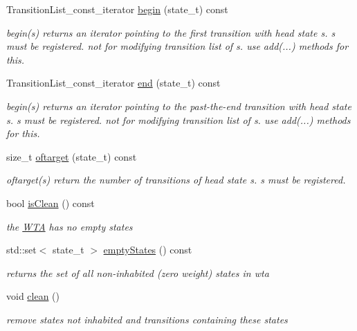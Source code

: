 \begin{DoxyCompactItemize}
Transition\+List\+\_\+const\+\_\+iterator \mbox{\hyperlink{group__schemata_ga23c3f9884c683e4bbab323208e08c672}{begin}} (state\+\_\+t) const
\begin{DoxyCompactList}\small\item\em begin(s) returns an iterator pointing to the first transition with head state s. s must be registered. not for modifying transition list of s. use add(...) methods for this. \end{DoxyCompactList}\item 
Transition\+List\+\_\+const\+\_\+iterator \mbox{\hyperlink{group__schemata_gaf5075f5a210343d6da208f4c80421cb5}{end}} (state\+\_\+t) const
\begin{DoxyCompactList}\small\item\em begin(s) returns an iterator pointing to the past-\/the-\/end transition with head state s. s must be registered. not for modifying transition list of s. use add(...) methods for this. \end{DoxyCompactList}\item 
size\+\_\+t \mbox{\hyperlink{group__schemata_ga28c9a7e35d4d516ef0f9967e773305f8}{oftarget}} (state\+\_\+t) const
\begin{DoxyCompactList}\small\item\em oftarget(s) return the number of transitions of head state s. s must be registered. \end{DoxyCompactList}\item 
bool \mbox{\hyperlink{group__schemata_ga9ef4193ae949ae7c9e52d30720e37202}{is\+Clean}} () const
\begin{DoxyCompactList}\small\item\em the \mbox{\hyperlink{classWTA}{W\+TA}} has no empty states \end{DoxyCompactList}\item 
std\+::set$<$ state\+\_\+t $>$ \mbox{\hyperlink{group__schemata_gaea41b32c37bbe955d0359039d7731fea}{empty\+States}} () const
\begin{DoxyCompactList}\small\item\em returns the set of all non-\/inhabited (zero weight) states in wta \end{DoxyCompactList}\item 
void \mbox{\hyperlink{group__schemata_gaec169477bdc2cf883916c38dbc18e577}{clean}} ()
\begin{DoxyCompactList}\small\item\em remove states not inhabited and transitions containing these states \end{DoxyCompactList}\item 

\end{DoxyCompactItemize}
